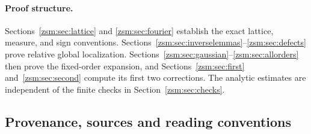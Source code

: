 \documentclass[11pt]{article}
\theoremstyle{definition}\newtheorem{definition}[theorem]{Definition}
\theoremstyle{remark}\newtheorem{remark}[theorem]{Remark}
\begin{document}
\paragraph{Proof structure.}
Sections~\ref{zsm:sec:lattice} and \ref{zsm:sec:fourier} establish the exact lattice,
measure, and sign conventions. Sections~\ref{zsm:sec:inverselemmas}--\ref{zsm:sec:defects}
prove relative global localization. Sections~\ref{zsm:sec:gaussian}--\ref{zsm:sec:allorders}
then prove the fixed-order expansion, and Sections~\ref{zsm:sec:first} and~\ref{zsm:sec:second} compute its
first two corrections. The analytic estimates are independent of the finite checks
in Section~\ref{zsm:sec:checks}.

\subsection{Provenance, sources and reading conventions}\label{zsm:sec:provenance}
\end{document}
